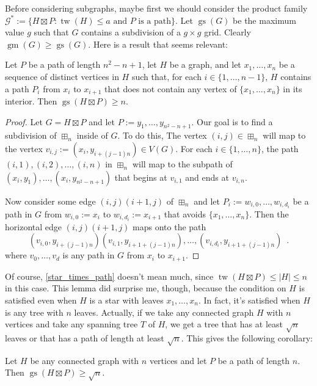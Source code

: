 \documentclass{patmorin}
\DeclareMathOperator{\tw}{tw}
\DeclareMathOperator{\gm}{gm}
\DeclareMathOperator{\gs}{gs}
\begin{document}
Before considering subgraphs, maybe first we should consider the product family $\mathcal{G}^*:=\{H\boxtimes P:\text{$\tw(H)\le a$ and $P$ is a path}\}$.  Let $\gs(G)$ be the maximum value $g$ such that $G$ contains a subdivision of a $g\times g$ grid.  Clearly $\gm(G)\ge\gs(G)$.  Here is a result that seems relevant:

\begin{lem}\label{star_times_path}
    Let $P$ be a path of length $n^2-n+1$, let $H$ be a graph, and let $x_1,\ldots,x_n$ be a sequence of distinct vertices in $H$ such that, for each $i\in\{1,\ldots,n-1\}$, $H$ contains a path $P_{i}$ from $x_i$ to $x_{i+1}$ that does not contain any vertex of $\{x_1,\ldots,x_n\}$ in its interior.  Then $\gs(H\boxtimes P)\ge n$.
\end{lem}

\begin{proof}
    Let $G=H\boxtimes P$ and let $P:=y_1,\ldots,y_{n^2-n+1}$.  Our goal is to find a subdivision of $\boxplus_n$ inside of $G$.  To do this, The vertex $(i,j)\in\boxplus_n$ will map to the vertex $v_{i,j}:=(x_i,y_{i+(j-1)n})\in V(G)$.  For each $i\in\{1,\ldots,n\}$, the path $(i,1),(i,2),\ldots,(i,n)$ in $\boxplus_n$ will map to the subpath of $(x_i,y_1),\ldots,(x_i,y_{n^2-n+1})$ that begins at $v_{i,1}$ and ends at $v_{i,n}$.

    Now consider some edge $(i,j)(i+1,j)$ of $\boxplus_n$ and let $P_i:=w_{i,0},\ldots,w_{i,d_i}$ be a path in $G$ from $w_{i,0}:=x_i$ to $w_{i,d_i}:=x_{i+1}$ that avoids $\{x_1,\ldots,x_n\}$.  Then the horizontal edge $(i,j)(i+1,j)$ maps onto the path
    \[
        (v_{i,0},y_{i+(j-1)n})(v_{i,1},y_{i+1+(j-1)n}),\ldots,(v_{i,d_i},y_{i+1+(j-1)n}) \enspace .
    \]
    where $v_0,\ldots,v_d$ is any path in $G$ from $x_{i}$ to $x_{i+1}$.
\end{proof}

Of course, \cref{star_times_path} doesn't mean much, since $\tw(H\boxtimes P)\le |H| \le n$ in this case.  This lemma did surprise me, though, because the condition on $H$ is satisfied even when $H$ is a star with leaves $x_1,\ldots,x_n$.  In fact, it's satisfied when $H$ is any tree with $n$ leaves.  Actually, if we take any connected graph $H$ with $n$ vertices and take any spanning tree $T$ of $H$, we get a tree that has at least $\sqrt{n}$ leaves or that has a path of length at least $\sqrt{n}$.  This gives the following corollary:

\begin{lem}\label{graph_times_path}
  Let $H$ be any connected graph with $n$ vertices and let $P$ be a path of length $n$.  Then $\gs(H\boxtimes P)\ge \sqrt{n}$.
\end{lem}
\end{document}
